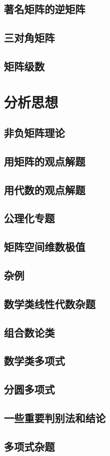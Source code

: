 \documentclass[lang=cn,10pt,thmcnt=section]{elegantbook}
\begin{document}
\section{著名矩阵的逆矩阵}

\section{三对角矩阵}

\section{矩阵级数}


\chapter{分析思想}

\section{非负矩阵理论}

\section{用矩阵的观点解题}

\section{用代数的观点解题}

\section{公理化专题}

\section{矩阵空间维数极值}

\section{杂例}



\section{数学类线性代数杂题}

\section{组合数论类}

\section{数学类多项式}

\section{分圆多项式}

\section{一些重要判别法和结论}

\section{多项式杂题}
\end{document}
